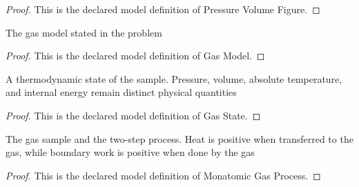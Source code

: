\begin{proof}
  This is the declared model definition of Pressure Volume Figure.
\end{proof}
\begin{definition}
  \label{def:physics:phyx-mini-0411:phyxminiproblems-problemphyxmini0411-gasmodel}
  The gas model stated in the problem
\end{definition}
\begin{proof}
  This is the declared model definition of Gas Model.
\end{proof}
\begin{definition}
  \label{def:physics:phyx-mini-0411:phyxminiproblems-problemphyxmini0411-gasstate}
  A thermodynamic state of the sample. Pressure, volume, absolute temperature, and internal energy remain distinct physical quantities
\end{definition}
\begin{proof}
  This is the declared model definition of Gas State.
\end{proof}
\begin{definition}
  \label{def:physics:phyx-mini-0411:phyxminiproblems-problemphyxmini0411-monatomicgasprocess}
  The gas sample and the two-step process. Heat is positive when transferred to the gas, while boundary work is positive when done by the gas
\end{definition}
\begin{proof}
  This is the declared model definition of Monatomic Gas Process.
\end{proof}
